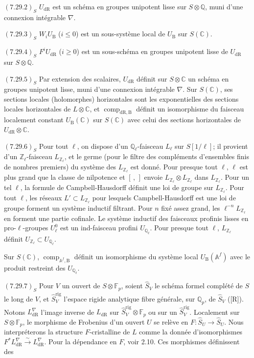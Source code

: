 \documentclass[12pt,a4paper]{article}
\theoremstyle{plain}
\theoremstyle{definition}
\theoremstyle{remark}
\DeclareMathOperator{\comp}{comp}
\newcommand{\rig}{\mathrm{rig}}
\newcommand{\DR}{\mathrm{dR}}
\newcommand{\B}{\mathrm{B}}
\newcommand{\Z}{\mathbb{Z}}
\newcommand{\Q}{\mathbb{Q}}
\newcommand{\C}{\mathbb{C}}
\newcommand{\F}{\mathbb{F}}
\newcommand{\A}{\mathbb{A}}
\begin{document}
$(7.29.2)_S$ $U_\DR$ est un sch\'ema en groupes unipotent lisse sur $S \otimes \Q$, muni d'une connexion int\'egrable $\nabla$.

$(7.29.3)_S$ $W_iU_\B$ ($i \leq 0$) est un sous-syst\`eme local de $U_\B$ sur $S(\C)$.

$(7.29.4)_S$ $F^iU_\DR$ ($i \geq 0$) est un sous-sch\'ema en groupes unipotent lisse de $U_\DR$ sur $S \otimes \Q$.

$(7.29.5)_S$ Par extension des scalaires, $U_\DR$ d\'efinit sur $S \otimes \C$ un sch\'ema en groupes unipotent lisse, muni d'une connexion int\'egrable $\nabla$. Sur $S(\C)$, ses sections locales (holomorphes) horizontales sont les exponentielles des sections locales horizontales de $L \otimes \C$, et $\comp_{\DR,\B}$ d\'efinit un isomorphisme du faisceau localement constant $U_\B(\C)$ sur $S(\C)$ avec celui des sections horizontales de $U_\DR \otimes \C$.

$(7.29.6)_S$ Pour tout $\ell$, on dispose d'un $\Q_\ell$-faisceau $L_\ell$ sur $S[1/\ell]$; il provient d'un $\Z_\ell$-faisceau $L_{\Z_\ell}$, et le germe (pour le filtre des compl\'ements d'ensembles finis de nombres premiers) du syst\`eme des $L_{\Z_\ell}$ est donn\'e. Pour presque tout $\ell$, $\ell$ est plus grand que la classe de nilpotence et $[\,,\,]$ envoie $L_{\Z_\ell} \otimes L_{\Z_\ell}$ dans $L_{\Z_\ell}$. Pour un tel $\ell$, la formule de Campbell-Hausdorff d\'efinit une loi de groupe sur $L_{\Z_\ell}$. Pour tout $\ell$, les r\'eseaux $L' \subset L_{\Z_\ell}$ pour lesquels Campbell-Hausdorff est une loi de groupe forment un syst\`eme inductif filtrant. Pour $n$ fix\'e assez grand, les $\ell^{-n}L_{\Z_\ell}$ en forment une partie cofinale. Le syst\`eme inductif des faisceaux profinis lisses en pro-$\ell$-groupes $U^0_\ell$ est un ind-faisceau profini $U_{\Q_\ell}$. Pour presque tout $\ell$, $L_{\Z_\ell}$ d\'efinit $U_{\Z_\ell} \subset U_{\Q_\ell}$.

Sur $S(\C)$, $\comp_{\A^f,\B}$ d\'efinit un isomorphisme du syst\`eme local $U_\B(\A^f)$ avec le produit restreint des $U_{\Q_\ell}$.

$(7.29.7)_S$ Pour $V$ un ouvert de $S \otimes \F_p$, soient $\hat{S}_V$ le sch\'ema formel compl\'et\'e de $S$ le long de $V$, et $\hat{S}^{\rig}_V$ l'espace rigide analytique fibre g\'en\'erale, sur $\Q_p$, de $\hat{S}_V$ ([R]). Notons $L^{\nabla}_\DR$ l'image inverse de $L_\DR$ sur $\hat{S}^{\rig}_V \otimes \F_p$ ou sur un $\hat{S}^{\rig}_V$. Localement sur $S \otimes \F_p$, le morphisme de Frobenius d'un ouvert $U$ se rel\`eve en $F: \hat{S}_U \to \hat{S}_U$. Nous interpr\'eterons la structure $F$-cristalline de $L$ comme la donn\'ee d'isomorphismes $F^*L^{\nabla}_\DR \xrightarrow{\sim} L^{\nabla}_\DR$. Pour la d\'ependance en $F$, voir 2.10. Ces morphismes d\'efinissent des
\end{document}
